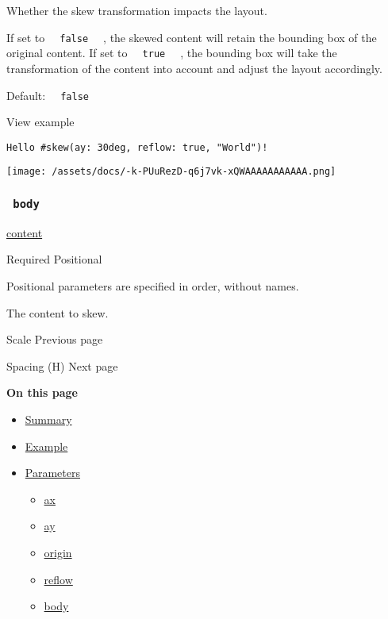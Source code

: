 Whether the skew transformation impacts the layout.

If set to \texttt{\ }{\texttt{\ false\ }}\texttt{\ } , the skewed
content will retain the bounding box of the original content. If set to
\texttt{\ }{\texttt{\ true\ }}\texttt{\ } , the bounding box will take
the transformation of the content into account and adjust the layout
accordingly.

Default: \texttt{\ }{\texttt{\ false\ }}\texttt{\ }


View example

\begin{verbatim}
Hello #skew(ay: 30deg, reflow: true, "World")!
\end{verbatim}

\texttt{[image: /assets/docs/-k-PUuRezD-q6j7vk-xQWAAAAAAAAAAA.png]}

\subsubsection{\texorpdfstring{\texttt{\ body\ }}{ body }}\label{parameters-body}

\href{/docs/reference/foundations/content/}{content}

{Required} {{ Positional }}

\label{parameters-body-positional-tooltip}
Positional parameters are specified in order, without names.

The content to skew.

\href{/docs/reference/layout/scale/}{\pandocbounded{}}

{ Scale } { Previous page }

\href{/docs/reference/layout/h/}{\pandocbounded{}}

{ Spacing (H) } { Next page }

\textbf{On this page}

\begin{itemize}
\tightlist
\item
  \hyperref[summary]{Summary}
\item
  \hyperref[example]{Example}
\item
  \hyperref[parameters]{Parameters}

  \begin{itemize}
  \tightlist
  \item
    \hyperref[parameters-ax]{ax}
  \item
    \hyperref[parameters-ay]{ay}
  \item
    \hyperref[parameters-origin]{origin}
  \item
    \hyperref[parameters-reflow]{reflow}
  \item
    \hyperref[parameters-body]{body}
  \end{itemize}
\end{itemize}

